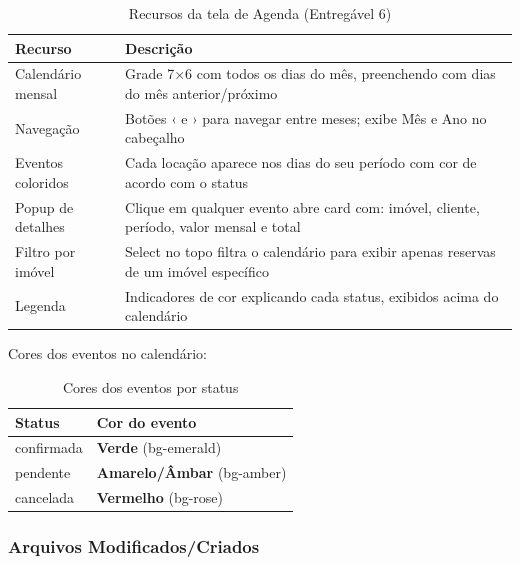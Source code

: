 \documentclass[12pt, a4paper]{article}
\newcommand{\thead}[1]{\cellcolor{tableheader}\color{white}\bfseries #1}
\newcommand{\talt}{\rowcolor{tablerowalt}}
\begin{document}
\begin{table}[H]
\centering
\begin{tabularx}{\textwidth}{|l|X|}
\hline
\thead{Recurso} & \thead{Descrição} \\
\hline
Calendário mensal & Grade 7×6 com todos os dias do mês, preenchendo com dias do mês anterior/próximo \\
\talt Navegação        & Botões ‹ e › para navegar entre meses; exibe Mês e Ano no cabeçalho \\
Eventos coloridos & Cada locação aparece nos dias do seu período com cor de acordo com o status \\
\talt Popup de detalhes & Clique em qualquer evento abre card com: imóvel, cliente, período, valor mensal e total \\
Filtro por imóvel & Select no topo filtra o calendário para exibir apenas reservas de um imóvel específico \\
\talt Legenda          & Indicadores de cor explicando cada status, exibidos acima do calendário \\
\hline
\end{tabularx}
\caption{Recursos da tela de Agenda (Entregável 6)}
\end{table}

Cores dos eventos no calendário:

\begin{table}[H]
\centering
\begin{tabular}{|l|l|}
\hline
\thead{Status} & \thead{Cor do evento} \\
\hline
confirmada & \textcolor{successgreen}{\textbf{Verde}} (bg-emerald) \\
\talt pendente   & \textcolor{warnyellow}{\textbf{Amarelo/Âmbar}} (bg-amber) \\
cancelada  & \textcolor{dangerred}{\textbf{Vermelho}} (bg-rose) \\
\hline
\end{tabular}
\caption{Cores dos eventos por status}
\end{table}

\subsubsection{Arquivos Modificados/Criados}
\end{document}

